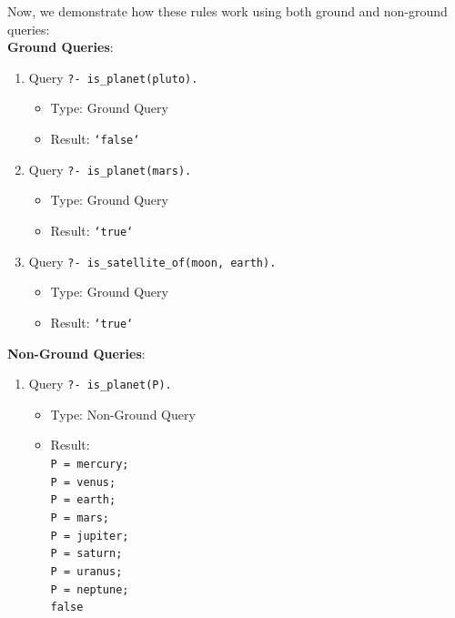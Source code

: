 \documentclass[12pt]{article}
\begin{document}
\begin{spacing}{1.5}
\begin{enumerate}
		      Now, we demonstrate how these rules work using both ground and non-ground queries:\\

		      \textbf{Ground Queries}:

		      \begin{enumerate}
		      	\item 
		      	      Query \texttt{?- is\_planet(pluto).}
		      	      \begin{itemize}
		      	      	\item Type: Ground Query
		      	      	\item Result: \texttt{`false`}
		      	      \end{itemize}
		      	           
		      	\item 
		      	      Query \texttt{?- is\_planet(mars).}
		      	      \begin{itemize}
		      	      	\item Type: Ground Query
		      	      	\item Result: \texttt{`true`}
		      	      \end{itemize}
		      	           
		      	\item 
		      	      Query \texttt{?- is\_satellite\_of(moon, earth).}
		      	      \begin{itemize}
		      	      	\item Type: Ground Query
		      	      	\item Result: \texttt{`true`}\\
		      	      \end{itemize}
		      \end{enumerate}
		      		      		      		      		      		      		      		      		      
		      \textbf{Non-Ground Queries}:
		      \begin{enumerate}
		      	 	
		      	\item 
		      	      Query \texttt{?- is\_planet(P).}
		      	      \begin{itemize}
		      	      	\item Type: Non-Ground Query
		      	      	\item Result: \texttt{\\
		      	      		P = mercury;\\
		      	      		P = venus;\\
		      	      		P = earth;\\
		      	      		P = mars;\\
		      	      		P = jupiter;\\
		      	      		P = saturn;\\
		      	      		P = uranus;\\
		      	      		P = neptune;\\
		      	      	false}
		      	      \end{itemize}
		      	           

\end{enumerate}
\end{enumerate}
\end{spacing}
\end{document}
